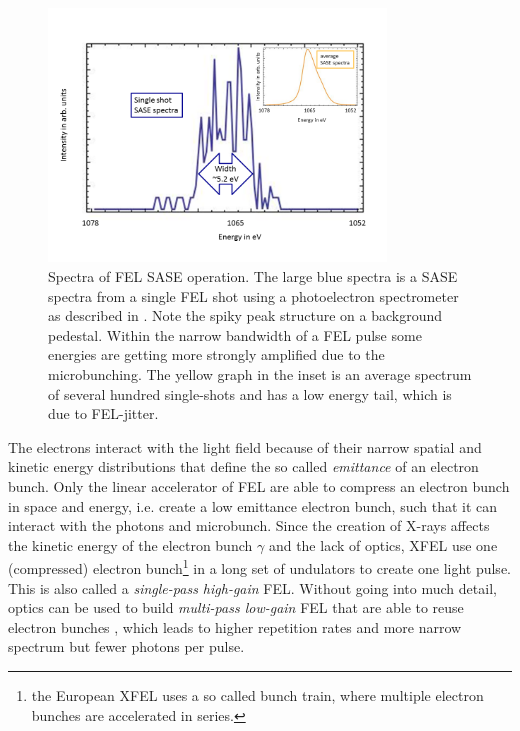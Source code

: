 \begin{figure}
	\centering
		\includegraphics[width=0.80\textwidth]{images/SASE-spectra.png}
	\caption[SASE single-shot and average spectra]{Spectra of FEL SASE operation. The large blue spectra is a SASE spectra from a single FEL shot using a photoelectron spectrometer as described in \citep{Bucher-2014-Unpublished}. Note the spiky peak structure on a background pedestal. Within the narrow bandwidth of a FEL pulse some energies are getting more strongly amplified due to the microbunching. The yellow graph in the inset is an average spectrum of several hundred single-shots and has a low energy tail, which is due to FEL-jitter.}
	\label{fig:SASE-spectra}
\end{figure}
The electrons interact with the light field because of their narrow spatial and kinetic energy distributions that define the so called \textit{emittance} of an electron bunch. Only the linear accelerator of FEL are able to compress an electron bunch in space and energy, i.e. create a low emittance electron bunch, such that it can interact with the photons and microbunch. Since the creation of X-rays affects the kinetic energy of the electron bunch $\gamma$ and the lack of optics, XFEL use one (compressed) electron bunch\footnote{the European XFEL uses a so called bunch train, where multiple electron bunches are accelerated in series.} in a long set of undulators to create one light pulse. This is also called a \textit{single-pass high-gain} FEL. Without going into much detail, optics can be used to build \textit{multi-pass low-gain} FEL that are able to reuse electron bunches \citep{Kim-2008-PRL}, which leads to higher repetition rates and more narrow spectrum but fewer photons per pulse.
%
%
%
%
